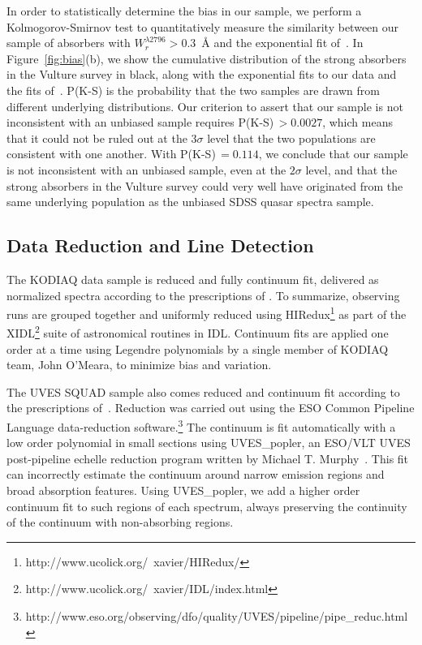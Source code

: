 \documentclass[iop,apj,numberedappendix,appendixfloats,twocolappendix]{emulateapj}
\begin{document}
In order to statistically determine the bias in our sample, we perform a Kolmogorov-Smirnov test to quantitatively measure the similarity between our sample of absorbers with $W_r^{\lambda2796} > 0.3$~{\AA} and the exponential fit of~\cite{Nestor2005}. In Figure~\ref{fig:bias}(b), we show the cumulative distribution of the strong absorbers in the Vulture survey in black, along with the exponential fits to our data and the fits of~\cite{Nestor2005}. P(K-S) is the probability that the two samples are drawn from different underlying distributions. Our criterion to assert that our sample is not inconsistent with an unbiased sample requires P(K-S)$\, > 0.0027$, which means that it could not be ruled out at the $3\sigma$ level that the two populations are consistent with one another. With P(K-S)$\, = 0.114$, we conclude that our sample is not inconsistent with an unbiased sample, even at the $2\sigma$ level, and that the strong absorbers in the Vulture survey could very well have originated from the same underlying population as the unbiased SDSS quasar spectra sample.


\subsection{Data Reduction and Line Detection}
\label{sec:detection}

The KODIAQ data sample is reduced and fully continuum fit, delivered as normalized spectra according to the prescriptions of \cite{OMeara2015}. To summarize, observing runs are grouped together and uniformly reduced using HIRedux\footnote{http://www.ucolick.org/~xavier/HIRedux/} as part of the XIDL\footnote{http://www.ucolick.org/~xavier/IDL/index.html} suite of astronomical routines in IDL. Continuum fits are applied one order at a time using Legendre polynomials by a single member of KODIAQ team, John O'Meara, to minimize bias and variation. 

The UVES SQUAD sample also comes reduced and continuum fit according to the prescriptions of~\cite{King2012,Bagdonaite2014,Murphy2016,Murphyprep}. Reduction was carried out using the ESO Common Pipeline Language data-reduction software.\footnote{http://www.eso.org/observing/dfo/quality/UVES/pipeline/pipe\_reduc.html} The continuum is fit automatically with a low order polynomial in small sections using UVES\_popler, an ESO/VLT UVES post-pipeline echelle reduction program written by Michael T. Murphy~\citep{MurphyPOPLER}. This fit can incorrectly estimate the continuum around narrow emission regions and broad absorption features. Using UVES\_popler, we add a higher order continuum fit to such regions of each spectrum, always preserving the continuity of the continuum with non-absorbing regions. 
\end{document}
